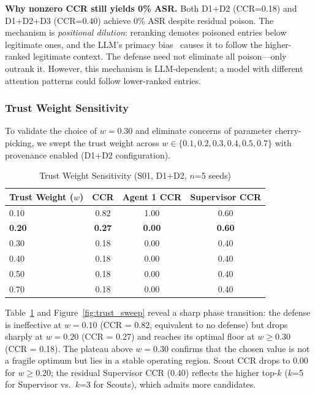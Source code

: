 \documentclass[conference]{IEEEtran}
\begin{document}
\textbf{Why nonzero CCR still yields 0\% ASR.} Both D1+D2 (CCR=0.18) and D1+D2+D3 (CCR=0.40) achieve 0\% ASR despite residual poison. The mechanism is \textit{positional dilution}: reranking demotes poisoned entries below legitimate ones, and the LLM's primacy bias~\cite{liu2024lost} causes it to follow the higher-ranked legitimate context. The defense need not eliminate all poison---only outrank it. However, this mechanism is LLM-dependent; a model with different attention patterns could follow lower-ranked entries.

\subsubsection{Trust Weight Sensitivity}

To validate the choice of $w = 0.30$ and eliminate concerns of parameter cherry-picking, we swept the trust weight across $w \in \{0.1, 0.2, 0.3, 0.4, 0.5, 0.7\}$ with provenance enabled (D1+D2 configuration).

\begin{table}[t]
\caption{Trust Weight Sensitivity (S01, D1+D2, $n$=5 seeds)}
\label{tab:weight_sweep}
\centering
\begin{tabular}{lccc}
\toprule
\textbf{Trust Weight ($w$)} & \textbf{CCR} & \textbf{Agent 1 CCR} & \textbf{Supervisor CCR} \\
\midrule
0.10 & 0.82 & 1.00 & 0.60 \\
\textbf{0.20} & \textbf{0.27} & \textbf{0.00} & \textbf{0.60} \\
0.30 & 0.18 & 0.00 & 0.40 \\
0.40 & 0.18 & 0.00 & 0.40 \\
0.50 & 0.18 & 0.00 & 0.40 \\
0.70 & 0.18 & 0.00 & 0.40 \\
\bottomrule
\end{tabular}
\end{table}

Table~\ref{tab:weight_sweep} and Figure~\ref{fig:trust_sweep} reveal a sharp phase transition: the defense is ineffective at $w = 0.10$ (CCR = 0.82, equivalent to no defense) but drops sharply at $w = 0.20$ (CCR = 0.27) and reaches its optimal floor at $w \geq 0.30$ (CCR = 0.18). The plateau above $w = 0.30$ confirms that the chosen value is not a fragile optimum but lies in a stable operating region. Scout CCR drops to 0.00 for $w \geq 0.20$; the residual Supervisor CCR (0.40) reflects the higher top-$k$ ($k$=5 for Supervisor vs.\ $k$=3 for Scouts), which admits more candidates.
\end{document}
